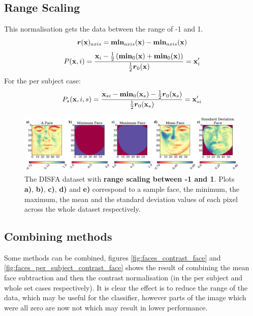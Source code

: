     \subsection{Range Scaling}
      This normalisation gets the data between the range of -1 and 1.
      \begin{equation}
        {\boldsymbol r}({\bf x})_{axis} = {\boldsymbol \min}_{axis}({\bf x}) - {\boldsymbol \min}_{axis}({\bf x})
      \end{equation}
      \begin{equation}
         P({\bf x},i) =
         \frac{{\bf x}_{i} - \frac{1}{2}\left ( {\boldsymbol \min}_0({\bf x}) + {\boldsymbol \min}_0({\bf x}) \right ) }{\frac{1}{2}{\boldsymbol r}_0({\bf x})}
         = {\bf x}_{i}'
      \end{equation}
      For the per subject case:
      \begin{equation}
         P_s({\bf x},i,s) =
         \frac{{\bf x}_{si} - {\boldsymbol \min}_0({\bf x}_s) - \frac{1}{2}{\boldsymbol r}_0({\bf x}_s) }{\frac{1}{2}{\boldsymbol r}_0({\bf x}_s)}
         = {\bf x}_{si}'
      \end{equation}
      \begin{figure}[!h] \centering
      \includegraphics[width =\hsize]{figures/faces_range.pdf}
      \caption{The DISFA dataset with {\bf range scaling between -1 and 1}.
      Plots {\bf a)}, {\bf b)}, {\bf c)}, {\bf d)} and {\bf e)}
      correspond to a sample face, the minimum, the maximum,
      the mean and the standard deviation values of each pixel across
      the whole dataset respectively.}
      \label{fig:simple} \end{figure}

    \subsection{Combining methods}
      Some methods can be combined, figures \ref{fig:faces_contrast_face} and \ref{fig:faces_per_subject_contrast_face}
      shows the result of combining the mean face subtraction and then the
      contrast normalisation (in the per subject and whole set cases respectively). It is clear the effect is to
      reduce the range of the data, which may be useful for the classifier, however parts of the image
      which were all zero are now not which may result in lower performance.

